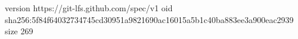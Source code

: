 version https://git-lfs.github.com/spec/v1
oid sha256:5f84f64032734745cd30951a9821690ac16015a5b1c40ba883ee3a900eac2939
size 269
